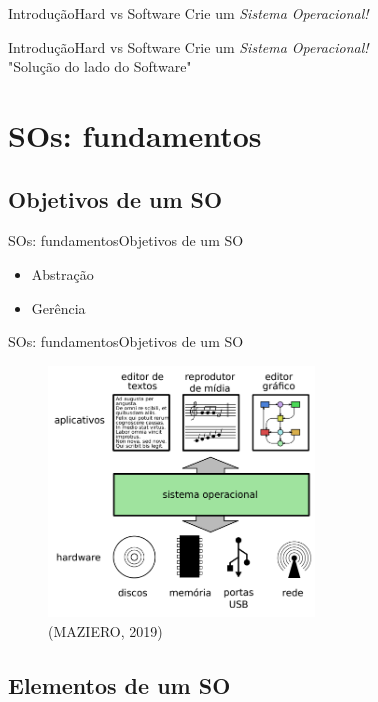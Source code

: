 \documentclass{beamer}
\begin{document}
      \begin{frame}{Introdução}{Hard vs Software}
        Crie um \emph{Sistema Operacional!}
      \end{frame}

      \begin{frame}{Introdução}{Hard vs Software}
        Crie um \emph{Sistema Operacional!}\\
        "Solução do lado do Software"
      \end{frame}

  \section{SOs: fundamentos}
    \subsection{Objetivos de um SO}

      \begin{frame}{SOs: fundamentos}{Objetivos de um SO}
        \begin{itemize}
        \item Abstração
        \item Gerência
        \end{itemize}
      \end{frame}

      \begin{frame}{SOs: fundamentos}{Objetivos de um SO}
        \begin{figure}[!htb]
          \centering
          \includegraphics[width=200pt, keepaspectratio=true]{fundamentos/SOComoUmaInterface.png}
          \caption{(MAZIERO, 2019)}
          \label{SOComoUmaInterface}
        \end{figure}
      \end{frame}

    \subsection{Elementos de um SO}
\end{document}
